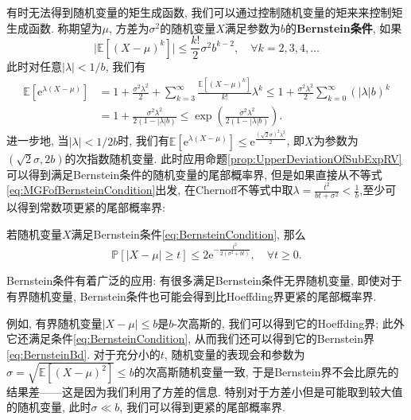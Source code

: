 有时无法得到随机变量的矩生成函数, 我们可以通过控制随机变量的矩来来控制矩生成函数.   
称期望为$\mu$, 方差为$\sigma^2$的随机变量$X$满足参数为$b$的\textbf{Bernstein条件}, 如果
\begin{equation}\label{eq:BernsteinCondition}
	\bigg|\mathbb{E}\left[(X - \mu)^k\right]\bigg|
	\leq \frac{k!}{2} \sigma^2 b^{k-2}, \quad \forall k = 2,3,4, \dots
\end{equation}
此时对任意$|\lambda| < 1/b$, 我们有
\begin{equation}\label{eq:MGFofBernsteinCondition}
	\begin{aligned}
	\mathbb{E}[\mathrm{e}^{\lambda(X-\mu)}]
	&= 1 + \frac{\sigma^2 \lambda^2}{2} + \sum_{k=3}^{\infty} \frac{\mathbb{E}[(X-\mu)^k]}{k!} \lambda^k  
	\leq 1 + \frac{\sigma^2 \lambda^2}{2} \sum_{k=0}^{\infty} (|\lambda| b)^k \\
	&= 1 + \frac{\sigma^2 \lambda^2}{2(1 - |\lambda| b)}
	\leq \exp \left( \frac{\sigma^2 \lambda^2}{2(1 - |\lambda| b)} \right).
	\end{aligned}
\end{equation}
进一步地, 当$|\lambda| < 1/2b$时, 我们有$\mathbb{E}[\mathrm{e}^{\lambda(X-\mu)}] \leq \mathrm{e}^{\frac{(\sqrt{2} \sigma)^2 \lambda^2}{2}}$, 即$X$为参数为$(\sqrt{2} \sigma, 2b)$的次指数随机变量. 
此时应用命题\ref{prop:UpperDeviationOfSubExpRV}可以得到满足Bernstein条件的随机变量的尾部概率界, 但是如果直接从不等式\eqref{eq:MGFofBernsteinCondition}出发, 在Chernoff不等式中取$\lambda = \frac{t^2}{bt + \sigma^2} < \frac{1}{b}$,至少可以得到常数项更紧的尾部概率界: 
\begin{proposition}[Bernstein界]
	若随机变量$X$满足Bernstein条件\eqref{eq:BernsteinCondition}, 那么
	\begin{equation}\label{eq:BernsteinBd}
		\mathbb{P}[|X-\mu| \geq t] \leq 2 \mathrm{e}^{-\frac{t^2}{2(\sigma^2 + bt)}}, \quad \forall t \geq 0. 
	\end{equation}
\end{proposition}
\begin{remark}\label{rm:UsingDistributionMethod}
	Bernstein条件有着广泛的应用: 有很多满足Bernstein条件无界随机变量, 即使对于有界随机变量, Bernstein条件也可能会得到比Hoeffding界更紧的尾部概率界.  
	
	例如, 有界随机变量$|X - \mu| \leq b$是$b$-次高斯的, 我们可以得到它的Hoeffding界; 此外它还满足条件\eqref{eq:BernsteinCondition}, 从而我们还可以得到它的Bernstein界\eqref{eq:BernsteinBd}. 
	对于充分小的$t$, 随机变量的表现会和参数为$\sigma = \sqrt{\mathbb{E}[(X-\mu)^2]} \leq b$的次高斯随机变量一致, 于是Bernstein界不会比原先的结果差——这是因为我们利用了方差的信息. 
	特别对于方差小但是可能取到较大值的随机变量, 此时$\sigma \ll b$, 我们可以得到更紧的尾部概率界. 
\end{remark}


